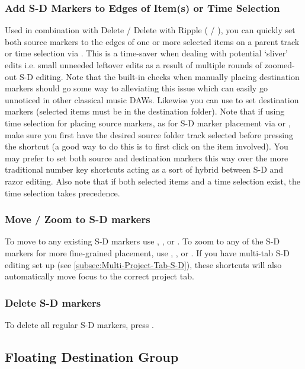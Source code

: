 \documentclass[10pt,american]{article}
\begin{document}
\subsubsection{Add S-D Markers to Edges of Item(s) or Time Selection}

Used in combination with Delete / Delete with Ripple (\keys{\ctrl+\backspace} /
\keys{\backspace}), you can quickly set both source markers to the edges of one
or more selected items on a parent track or time selection via . This
is a time-saver when dealing with potential `sliver' edits i.e. small unneeded
leftover edits as a result of multiple rounds of zoomed-out S-D editing. Note
that the built-in checks when manually placing destination markers should go
some way to alleviating this issue which can easily go unnoticed in other
classical music DAWs. Likewise you can use  to set destination
markers (selected items must be in the destination folder). Note that if using
time selection for placing source markers, as for S-D marker placement via
 or , make sure you first have the desired source folder track
selected before pressing the shortcut (a good way to do this is to first click
on the item involved). You may prefer to set both source and destination markers
this way over the more traditional number key shortcuts acting as a sort of
hybrid between S-D and razor editing. Also note that if both selected items and
a time selection exist, the time selection takes precedence.

\subsubsection{Move / Zoom to S-D markers}

To move to any existing S-D markers use , ,  or
. To zoom to any of the S-D markers for more fine-grained placement, use
, ,  or . If you have multi-tab S-D editing
set up (see \ref{subsec:Multi-Project-Tab-S-D}), these shortcuts will also
automatically move focus to the correct project tab. 

\subsubsection{Delete S-D markers}

To delete all regular S-D markers, press \keys{\ctrl+\del}.

\subsection{Floating Destination Group}
\end{document}
